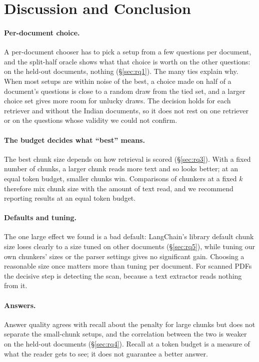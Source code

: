\section{Discussion and Conclusion}
\label{sec:discussion}

\paragraph{Per-document choice.} A per-document chooser has to pick a
setup from a few questions per document, and the split-half oracle shows
what that choice is worth on the other questions: on the held-out
documents, nothing (\S\ref{sec:rq1}). The many ties explain why. When
most setups are within noise of the best, a choice made on half of a
document's questions is close to a random draw from the tied set, and a
larger choice set gives more room for unlucky draws. The decision holds
for each retriever and without the Indian documents, so it does not rest
on one retriever or on the questions whose validity we could not confirm.

\paragraph{The budget decides what ``best'' means.} The best chunk size
depends on how retrieval is scored (\S\ref{sec:rq3}). With a fixed
number of chunks, a larger chunk reads more text and so looks better; at
an equal token budget, smaller chunks win. Comparisons of chunkers at a
fixed $k$ therefore mix chunk size with the amount of text read, and we
recommend reporting results at an equal token budget.

\paragraph{Defaults and tuning.} The one large effect we found is a bad
default: LangChain's library default chunk size loses clearly to a size
tuned on other documents (\S\ref{sec:rq5}), while tuning our own
chunkers' sizes or the parser settings gives no significant gain.
Choosing a reasonable size once matters more than tuning per document.
For scanned PDFs the decisive step is detecting the scan, because a text
extractor reads nothing from it.

\paragraph{Answers.} Answer quality agrees with recall about the penalty
for large chunks but does not separate the small-chunk setups, and the
correlation between the two is weaker on the held-out documents
(\S\ref{sec:rq4}). Recall at a token budget is a measure of what the
reader gets to see; it does not guarantee a better answer.

